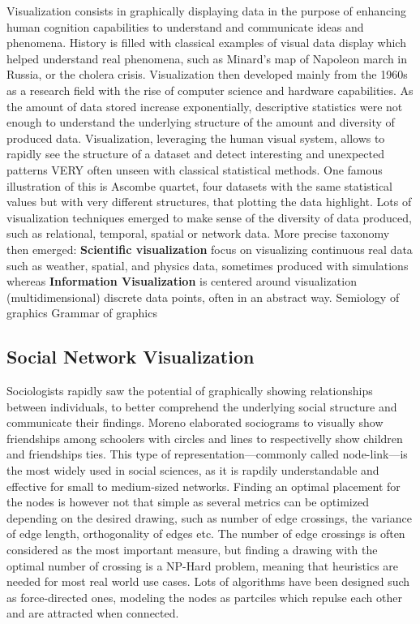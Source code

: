 Visualization consists in graphically displaying data in the purpose of enhancing human cognition capabilities to understand and communicate ideas and phenomena.
History is filled with classical examples of visual data display which helped understand real phenomena, such as Minard's map of Napoleon march in Russia, or the cholera crisis.
Visualization then developed mainly from the 1960s as a research field with the rise of computer science and hardware capabilities.
As the amount of data stored increase exponentially, descriptive statistics were not enough to understand the underlying structure of the amount and diversity of produced data.
Visualization, leveraging the human visual system, allows to rapidly see the structure of a dataset and detect interesting and unexpected patterns VERY often unseen with classical statistical methods. One famous illustration of this is Ascombe quartet, four datasets with the same statistical values but with very different structures, that plotting the data highlight.
Lots of visualization techniques emerged to make sense of the diversity of data produced, such as relational, temporal, spatial or network data.
More precise taxonomy then emerged: \textbf{Scientific visualization} focus on visualizing continuous real data such as weather, spatial, and physics data, sometimes produced with simulations whereas \textbf{Information Visualization} is centered around visualization (multidimensional) discrete data points, often in an abstract way.
Semiology of graphics
Grammar of graphics



\subsection{Social Network Visualization}

Sociologists rapidly saw the potential of graphically showing relationships between individuals, to better comprehend the underlying social structure and communicate their findings.
Moreno elaborated sociograms to visually show friendships among schoolers with circles and lines to respectivelly show children and friendships ties.
This type of representation---commonly called node-link---is the most widely used in social sciences, as it is rapdily understandable and effective for small to medium-sized networks.
Finding an optimal placement for the nodes is however not that simple as several metrics can be optimized depending on the desired drawing, such as number of edge crossings, the variance of edge length, orthogonality of edges etc.
The number of edge crossings is often considered as the most important measure, but finding a drawing with the optimal number of crossing is a NP-Hard problem, meaning that heuristics are needed for most real world use cases.
Lots of algorithms have been designed such as force-directed ones, modeling the nodes as partciles which repulse each other and are attracted when connected.






